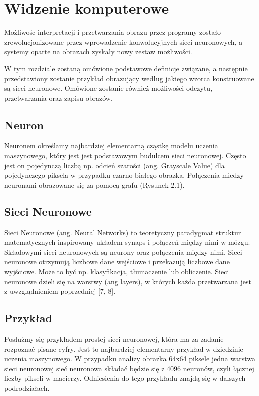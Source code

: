 \documentclass[brudnopis]{xmgr}
\begin{document}
	


\chapter{Widzenie komputerowe  }

Możliwośc interpretacji i przetwarzania obrazu przez programy zostało zrewolucjonizowane
przez wprowadzenie konwolucyjnych sieci neuronowych, a systemy oparte na obrazach zyskały nowy zestaw możliwości. 

W tym rozdziale zostaną omówione podstawowe definicje związane, a następnie przedstawiony zostanie przykład obrazujący według jakiego wzorca konstruowane są sieci neuronowe. Omówione zostanie również 
możliwości odczytu, przetwarzania oraz zapisu obrazów.

\section{Neuron  \label{s:dsssl}}

Neuronem określamy najbardziej elementarną cząstkę modelu uczenia maszynowego, który jest jest podstawowym budulcem sieci neuronowej. Często jest on pojedynczą liczbą np. odcień szarości (ang. Grayscale Value) dla pojedynczego piksela w przypadku czarno-białego obrazka. Połączenia miedzy neuronami obrazowane się za pomocą grafu (Rysunek 2.1).

\section{Sieci Neuronowe   \label{s:dsssl}}

Sieci Neuronowe (ang. Neural Networks) to teoretyczny paradygmat struktur matematycznych inspirowany układem synaps i połączeń między nimi w mózgu. Składowymi sieci neuronowych są neurony oraz połączenia między nimi. Sieci neuronowe otrzymują liczbowe dane wejściowe i przekazują liczbowe dane wyjściowe. Może to być np. klasyfikacja, tłumaczenie lub obliczenie. Sieci neuronowe dzieli się na warstwy (ang layers), w których każda przetwarzana jest z uwzglądnieniem poprzedniej [7, 8].



\section{Przykład  \label{s:dsssl}}

Posłużmy się przykładem prostej sieci neuronowej, która ma za zadanie rozpoznać pisane cyfry. Jest to najbardziej elementarny przykład w dziedzinie uczenia maszynowego.
W przypadku analizy obrazka 64x64 piksele jedna warstwa sieci neuronowej sieć neuronowa składać będzie się z 4096 neuronów, czyli łącznej liczby pikseli w macierzy. Odniesienia do tego przykładu znajdą się w dalszych podrodziałach.
\end{document}
